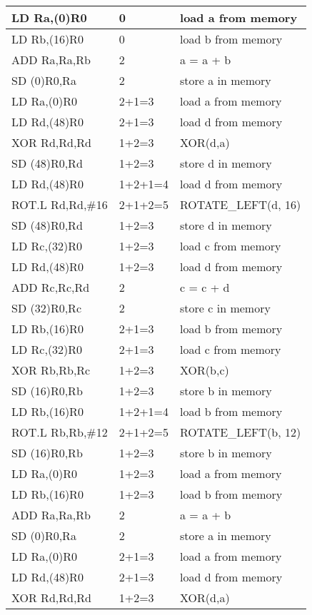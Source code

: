 \begin{enumerate}[wide, label=(B\arabic*)]
\begin{longtable}{|l|l|l|}
LD Ra,(0)R0	&0	& load a from memory  \\ \hline
LD Rb,(16)R0	&0	& load b from memory  \\ \hline
ADD Ra,Ra,Rb	&2	& a = a + b           \\ \hline
SD (0)R0,Ra	&2	& store a in memory   \\ \hline
LD Ra,(0)R0	&2+1=3	& load a from memory  \\ \hline
LD Rd,(48)R0	&2+1=3	& load d from memory  \\ \hline
XOR Rd,Rd,Rd	&1+2=3	& XOR(d,a)            \\ \hline
SD (48)R0,Rd	&1+2=3	& store d in memory   \\ \hline
LD Rd,(48)R0	&1+2+1=4& load d from memory  \\ \hline
ROT.L Rd,Rd,\#16&2+1+2=5& ROTATE\_LEFT(d, 16) \\ \hline
SD (48)R0,Rd	&1+2=3	& store d in memory   \\ \hline
LD Rc,(32)R0	&1+2=3	& load c from memory  \\ \hline
LD Rd,(48)R0	&1+2=3	& load d from memory  \\ \hline
ADD Rc,Rc,Rd	&2	& c = c + d           \\ \hline
SD (32)R0,Rc	&2	& store c in memory   \\ \hline
LD Rb,(16)R0	&2+1=3	& load b from memory  \\ \hline
LD Rc,(32)R0	&2+1=3	& load c from memory  \\ \hline
XOR Rb,Rb,Rc	&1+2=3	& XOR(b,c)            \\ \hline
SD (16)R0,Rb	&1+2=3	& store b in memory   \\ \hline
LD Rb,(16)R0	&1+2+1=4& load b from memory  \\ \hline
ROT.L Rb,Rb,\#12&2+1+2=5& ROTATE\_LEFT(b, 12) \\ \hline
SD (16)R0,Rb	&1+2=3	& store b in memory   \\ \hline
LD Ra,(0)R0	&1+2=3	& load a from memory  \\ \hline
LD Rb,(16)R0	&1+2=3	& load b from memory  \\ \hline
ADD Ra,Ra,Rb	&2	& a = a + b           \\ \hline
SD (0)R0,Ra	&2	& store a in memory   \\ \hline
LD Ra,(0)R0	&2+1=3	& load a from memory  \\ \hline
LD Rd,(48)R0	&2+1=3	& load d from memory  \\ \hline
XOR Rd,Rd,Rd	&1+2=3	& XOR(d,a)            \\ \hline

\end{longtable}
\end{enumerate}
